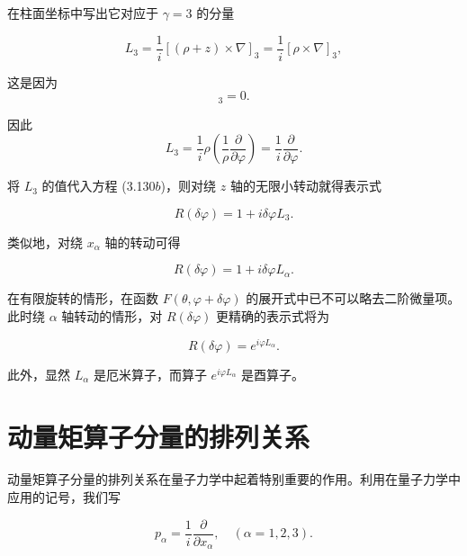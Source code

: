 在柱面坐标中写出它对应于 $\gamma = 3$ 的分量

\begin{equation*}
L _ {3} = \frac {1}{i} [ (\rho + z) \times \nabla ] _ {3} = \frac {1}{i} [ \rho \times \nabla ] _ {3},
\end{equation*}

这是因为
\begin{equation*}
[ \boldsymbol {z} \times \nabla ] _ {3} = 0.
\end{equation*}

因此
\begin{equation*}
L _ {3} = \frac {1}{i} \rho \left(\frac {1}{\rho} \frac {\partial}{\partial \varphi}\right) = \frac {1}{i} \frac {\partial}{\partial \varphi}.\tag{3.132}
\end{equation*}

将 $L_{3}$ 的值代入方程 (3.130$b$)，则对绕 $z$ 轴的无限小转动就得表示式

\begin{equation*}
R (\delta \varphi) = 1 + i \delta \varphi L _ {3}.\tag{3.133a}
\end{equation*}

类似地，对绕 $x_{\alpha}$ 轴的转动可得

\begin{equation*}
R (\delta \varphi) = 1 + i \delta \varphi L _ {\alpha}.\tag{3.133b}
\end{equation*}

在有限旋转的情形，在函数 $F(\theta, \varphi + \delta \varphi)$ 的展开式中已不可以略去二阶微量项。此时绕 $\alpha$ 轴转动的情形，对 $R(\delta \varphi)$ 更精确的表示式将为

\begin{equation*}
R (\delta \varphi) = e ^ {i \varphi L _ {\alpha}}.\tag{3.134}
\end{equation*}

此外，显然 $L_{\alpha}$ 是厄米算子，而算子 $e^{i\varphi L_{\alpha}}$ 是酉算子。

\section{动量矩算子分量的排列关系}

动量矩算子分量的排列关系在量子力学中起着特别重要的作用。利用在量子力学中应用的记号，我们写

\begin{equation*}
p _ {\alpha} = \frac {1}{i} \frac {\partial}{\partial x _ {\alpha}}, \quad (\alpha = 1, 2, 3).
\end{equation*}

